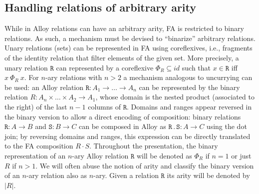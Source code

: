\documentclass{llncs}
\begin{document}
\subsection{Handling relations of arbitrary arity}
\label{sec:nary}

While in Alloy relations can have an arbitrary arity, FA is restricted to binary relations. As such, a mechanism must be devised to ``binarize'' arbitrary relations. Unary relations (sets) can be represented in FA using coreflexives, i.e., fragments of the identity relation that filter elements of the given set. More precisely, a unary relation $\mathtt{R}$ can represented by a coreflexive $\Phi_R \subseteq id$ such that $x \in \mathtt{R}$ iff $x\ \Phi_R\ x$. For $n$-ary relations with $n > 2$ a mechanism analogous to uncurrying can be used: an Alloy relation $\mathtt{R} : A_1 \rightarrow \dots \rightarrow A_n$ can be represented by the binary relation $R : A_n \times \dots \times A_2 \rightarrow A_1$, whose domain is the nested product (associated to the right) of the last $n-1$ columns of $\mathtt{R}$. Domains and ranges appear reversed in the binary version to allow a direct encoding of composition: binary relations $\mathtt{R} : A \rightarrow B$ and $\mathtt{S} : B \rightarrow C$ can be composed in Alloy as $\mathtt{R \,.\, S} : A \rightarrow C$ using the dot join; by reversing domains and ranges, this expression can be directly translated to the FA composition $R \cdot S$. Throughout the presentation, the binary representation of an $n$-ary Alloy relation $\mathtt{R}$ will be denoted as $\Phi_R$ if $n=1$ or just $R$ if $n>1$.  We will often abuse the notion of arity and classify the binary version of an $n$-ary relation also as $n$-ary. Given a relation $\mathtt{R}$ its arity will be denoted by $|R|$.
\end{document}
